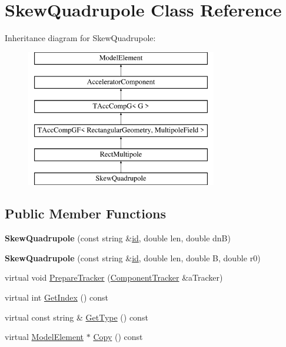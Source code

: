\hypertarget{classSkewQuadrupole}{}\section{Skew\+Quadrupole Class Reference}
\label{classSkewQuadrupole}
Inheritance diagram for Skew\+Quadrupole\+:\begin{figure}[H]
\begin{center}
\leavevmode
\includegraphics[height=6.000000cm]{classSkewQuadrupole}
\end{center}
\end{figure}
\subsection*{Public Member Functions}
\begin{DoxyCompactItemize}
\item 
\mbox{\label{classSkewQuadrupole_a04537b188938904ba23ca23bba8f9289}} 
{\bfseries Skew\+Quadrupole} (const string \&\hyperlink{classModelElement_aada171ead2085c75b592cf07d91bc5c2}{id}, double len, double dnB)
\item 
\mbox{\label{classSkewQuadrupole_a17d8811acbdd11bb1138c7e1049d1449}} 
{\bfseries Skew\+Quadrupole} (const string \&\hyperlink{classModelElement_aada171ead2085c75b592cf07d91bc5c2}{id}, double len, double B, double r0)
\item 
virtual void \hyperlink{classSkewQuadrupole_ac277fd65922256a16c1d2774254c09d2}{Prepare\+Tracker} (\hyperlink{classComponentTracker}{Component\+Tracker} \&a\+Tracker)
\item 
virtual int \hyperlink{classSkewQuadrupole_aa3fb2801ec77a1d9d4d7a4d603c2b767}{Get\+Index} () const
\item 
virtual const string \& \hyperlink{classSkewQuadrupole_a12f3bb5618dfc4516cf975c01f634a22}{Get\+Type} () const
\item 
virtual \hyperlink{classModelElement}{Model\+Element} $\ast$ \hyperlink{classSkewQuadrupole_af5c7ad09d1966dfd71144e6e08942a53}{Copy} () const
\end{DoxyCompactItemize}
